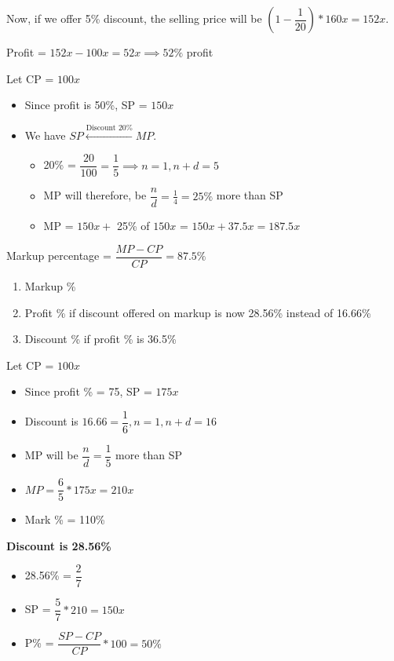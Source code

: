 Now, if we offer 5\% discount, the selling price will be $(1 - \dfrac{1}{20}) * 160x = 152x$. 

Profit = $152x - 100x = 52x \implies 52\% $ profit 



Let CP = $100x$

\begin{itemize}
    \item Since profit is 50\%, SP = $150x$
    \item We have $SP \xleftarrow{\text{Discount 20\%}} MP$. 
    \begin{itemize}
        \item 20\% = $\dfrac{20}{100} = \dfrac{1}{5} \implies n = 1, n+d = 5$
        \item MP will therefore, be $\dfrac{n}{d} = \frac{1}{4} = 25\%$ more than SP
        \item MP = $150x + $ 25\% of $150x$ = $150x + 37.5x = 187.5x$
    \end{itemize}
\end{itemize}

Markup percentage = $\dfrac{MP - CP}{CP} = 87.5\%$

\begin{enumerate}
    \item Markup \%
    \item Profit \% if discount offered on markup is now 28.56\% instead of 16.66\%
    \item Discount \% if profit \% is 36.5\%
\end{enumerate}

\vspace{0.5cm}
Let CP = $100x$
\begin{itemize}
    \item Since profit \% = 75, SP = $175x$
    \item Discount is $16.66 = \dfrac{1}{6}, n = 1, n+d = 16$
    \item MP will be $\dfrac{n}{d} = \dfrac{1}{5}$ more than SP
    \item $MP = \dfrac{6}{5} * 175x = 210x$
    \item Mark \% = 110\%
\end{itemize}

\textbf{Discount is 28.56\%}
\begin{itemize}
    \item 28.56\% = $\dfrac{2}{7}$
    \item SP = $\dfrac{5}{7} * 210 = 150x$
    \item P\% = $\dfrac{SP - CP}{CP} * 100 = 50\%$
\end{itemize}

